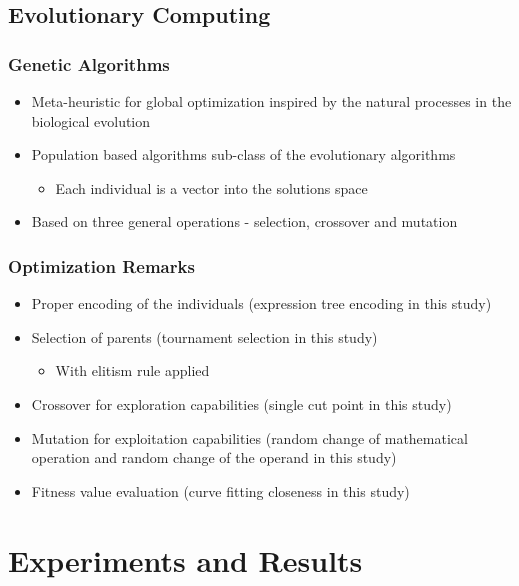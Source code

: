 \documentclass{beamer}
\begin{document}
\subsection{Evolutionary Computing}

\begin{frame}
\frametitle{Genetic Algorithms}
\begin{itemize}
	\item Meta-heuristic for global optimization inspired by the natural processes in the biological evolution
	\item Population based algorithms sub-class of the evolutionary algorithms
	\begin{itemize}
		\item Each individual is a vector into the solutions space
	\end{itemize}
	\item Based on three general operations - selection, crossover and mutation
\end{itemize}
\end{frame}

\begin{frame}
\frametitle{Optimization Remarks}
\begin{itemize}
	\item Proper encoding of the individuals (expression tree encoding in this study)
	\item Selection of parents (tournament selection in this study)
	\begin{itemize}
		\item With elitism rule applied
	\end{itemize}
	\item Crossover for exploration capabilities (single cut point in this study)
	\item Mutation for exploitation capabilities (random change of mathematical operation and random change of the operand in this study)
	\item Fitness value evaluation (curve fitting closeness in this study)
\end{itemize}
\end{frame}

\section{Experiments and Results}
\end{document}
